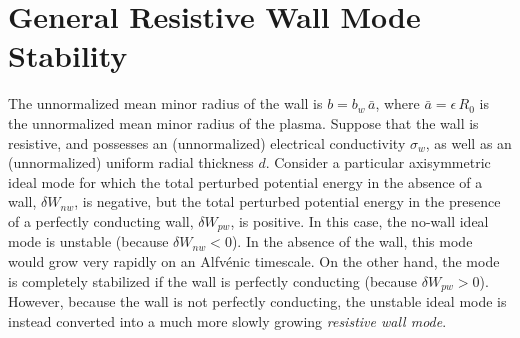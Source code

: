 \documentclass[12pt,prb,aps]{revtex4-1}
\begin{document}
\section{General Resistive Wall Mode Stability}\label{rwms}
The unnormalized mean minor radius of the wall is $b=b_w\,\bar{a}$, where $\bar{a}=\epsilon\,R_0$  is the unnormalized mean minor radius of the plasma. Suppose that the wall is resistive, and possesses an (unnormalized)  electrical conductivity $\sigma_w$, as well as an (unnormalized)  uniform radial thickness $d$. 
Consider a particular axisymmetric ideal mode for which the total perturbed potential energy in the absence of a wall, 
 $\delta W_{nw}$, is negative,  but the total perturbed potential energy in the presence of a perfectly conducting wall, $\delta W_{pw}$, is positive.  In this case,  the no-wall ideal mode is unstable (because $\delta W_{nw}<0$). In the absence of  the wall, this mode would grow very rapidly on an Alfv\'{e}nic timescale. On the other
 hand, the mode is completely stabilized if the wall is perfectly conducting (because $\delta W_{pw}>0$).  However, because the wall is not perfectly conducting, the unstable ideal mode is
 instead converted into a much more slowly growing {\em resistive wall mode}. 
 
\end{document}
